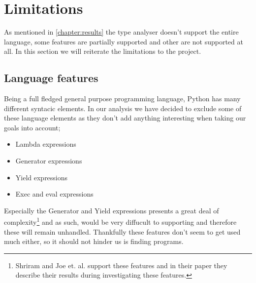 \chapter{Limitations}

As mentioned in \autoref{chapter:results} the type analyser doesn't support the entire language, some features are partially supported and other are not supported at all. In this section we will reiterate the limitations to the project.

\section{Language features}
Being a full fledged general purpose programming language, Python has many different syntacic elements. In our analysis we have decided to exclude some of these language elements as they don't add anything interesting when taking our goals into account;

\begin{itemize}
	\item Lambda expressions
	\item Generator expressions
	\item Yield expressions
        \item Exec and eval expressions
\end{itemize}

Especially the Generator and Yield expressions presents a great deal of complexity\footnote{Shriram and Joe et. al. support these features and in their paper they describe their results during investigating these features\cite{lambdapy}. } and as such, would be very diffucult to supporting and therefore these will remain unhandled. Thankfully these features don't seem to get used much either, so it should not hinder us is finding programs.


